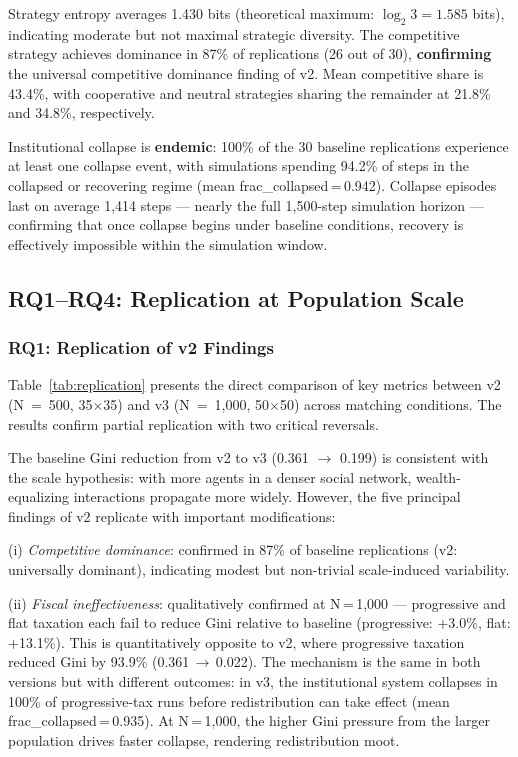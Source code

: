 \documentclass[12pt, letterpaper]{article}
\begin{document}
Strategy entropy averages 1.430 bits (theoretical maximum:
$\log_2 3 = 1.585$ bits), indicating moderate but not maximal
strategic diversity. The competitive strategy achieves dominance in
87\% of replications (26 out of 30), \textbf{confirming} the universal
competitive dominance finding of v2. Mean competitive share is 43.4\%,
with cooperative and neutral strategies sharing the remainder at 21.8\%
and 34.8\%, respectively.

Institutional collapse is \textbf{endemic}: 100\% of the 30 baseline
replications experience at least one collapse event, with simulations
spending 94.2\% of steps in the collapsed or recovering regime (mean
frac\_collapsed\,=\,0.942). Collapse episodes last on average 1,414
steps --- nearly the full 1,500-step simulation horizon --- confirming
that once collapse begins under baseline conditions, recovery is
effectively impossible within the simulation window.

\subsection{RQ1--RQ4: Replication at Population Scale}

\subsubsection{RQ1: Replication of v2 Findings}

Table~\ref{tab:replication} presents the direct comparison of key
metrics between v2 (N~=~500, 35$\times$35) and v3 (N~=~1,000,
50$\times$50) across matching conditions. The results confirm partial
replication with two critical reversals.

The baseline Gini reduction from v2 to v3 (0.361 $\to$ 0.199) is
consistent with the scale hypothesis: with more agents in a denser
social network, wealth-equalizing interactions propagate more widely.
However, the five principal findings of v2 replicate with important
modifications:

\noindent
(i) \emph{Competitive dominance}: confirmed in 87\% of baseline
replications (v2: universally dominant), indicating modest but
non-trivial scale-induced variability.

\noindent
(ii) \emph{Fiscal ineffectiveness}: qualitatively confirmed at N\,=\,1,000
--- progressive and flat taxation each fail to reduce Gini relative to
baseline (progressive: $+$3.0\%, flat: $+$13.1\%). This is quantitatively
opposite to v2, where progressive taxation reduced Gini by 93.9\%
(0.361\,$\to$\,0.022). The mechanism is the same in both versions but with
different outcomes: in v3, the institutional system collapses in 100\%
of progressive-tax runs before redistribution can take effect
(mean frac\_collapsed\,=\,0.935). At N\,=\,1,000, the higher Gini
pressure from the larger population drives faster collapse, rendering
redistribution moot.
\end{document}

